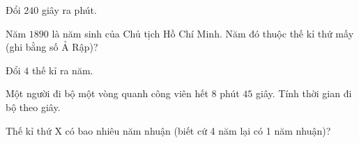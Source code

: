 \begin{ex} %
Đổi $240$ giây ra phút.
\end{ex}

\begin{ex} %
Năm $1890$ là năm sinh của Chủ tịch Hồ Chí Minh. Năm đó thuộc thế kỉ thứ mấy (ghi bằng số Ả Rập)?
\end{ex}

\begin{ex} %
Đổi $4$ thế kỉ ra năm.
\end{ex}

\begin{ex} %
Một người đi bộ một vòng quanh công viên hết $8$ phút $45$ giây. Tính thời gian đi bộ theo giây.
\end{ex}

\begin{ex} %
Thế kỉ thứ X có bao nhiêu năm nhuận (biết cứ 4 năm lại có 1 năm nhuận)?
\end{ex}
